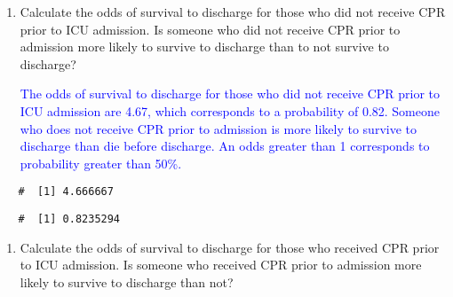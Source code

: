 \documentclass[letterpaper,12pt,twoside,]{pinp}
\begin{document}
\begin{enumerate}
  \begin{enumerate}
  \def\labelenumii{\alph{enumii})}
  \item
    Calculate the odds of survival to discharge for those who did not
    receive CPR prior to ICU admission. Is someone who did not receive
    CPR prior to admission more likely to survive to discharge than to
    not survive to discharge?

    \textcolor{blue}{The odds of survival to discharge for those who did not receive CPR prior to ICU admission are 4.67, which corresponds to a probability of 0.82. Someone who does not receive CPR prior to admission is more likely to survive to discharge than die before discharge. An odds greater than 1 corresponds to probability greater than 50\%.}
  \end{enumerate}

\begin{Shaded}
\begin{Highlighting}[]
\OtherTok{=} \SpecialCharTok{/}
\end{Highlighting}
\end{Shaded}

  \begin{ShadedResult}
   \begin{verbatim}
   #  [1] 4.666667
   \end{verbatim}
   \end{ShadedResult}

\begin{Shaded}
\begin{Highlighting}[]
\OtherTok{=}\SpecialCharTok{/}\NormalTok{(} \SpecialCharTok{+}
\end{Highlighting}
\end{Shaded}

  \begin{ShadedResult}
   \begin{verbatim}
   #  [1] 0.8235294
   \end{verbatim}
   \end{ShadedResult}

  \begin{enumerate}
  \def\labelenumii{\alph{enumii})}
  \setcounter{enumii}{1}
  \item
    Calculate the odds of survival to discharge for those who received
    CPR prior to ICU admission. Is someone who received CPR prior to
    admission more likely to survive to discharge than not?


\end{enumerate}
\end{enumerate}
\end{document}
